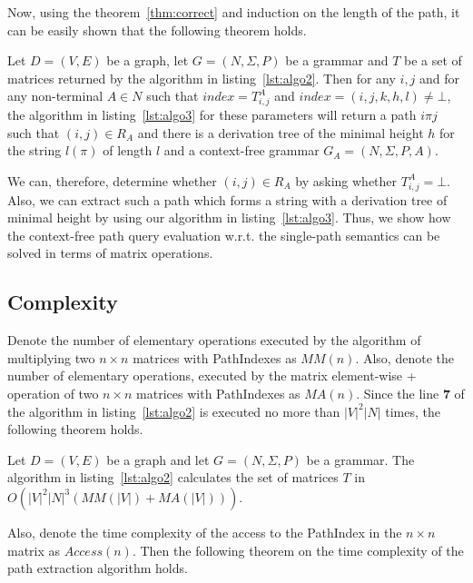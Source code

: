 Now, using the theorem~\ref{thm:correct} and induction on the length of the path, it can be easily shown that the following theorem holds.

\begin{mytheorem}\label{thm:correct_extraction}
	Let $D = (V,E)$ be a graph, let $G =(N,\Sigma,P)$ be a grammar and $T$ be a set of matrices returned by the algorithm in listing~\ref{lst:algo2}. Then for any $i, j$ and for any non-terminal $A \in N$ such that $index = T^A_{i,j}$ and $index = (i,j,k,h,l) \neq \bot$, the algorithm in listing~\ref{lst:algo3} for these parameters will return a path $i \pi j$ such that $(i,j) \in R_A$ and there is a derivation tree of the minimal height $h$ for the string $l(\pi)$ of length $l$ and a context-free grammar $G_A = (N,\Sigma,P,A)$.
\end{mytheorem}

We can, therefore, determine whether $(i,j) \in R_A$ by asking whether $T^A_{i,j} = \bot$. Also, we can extract such a path which forms a string with a derivation tree of minimal height by using our algorithm in listing~\ref{lst:algo3}. Thus, we show how the context-free path query evaluation w.r.t. the single-path semantics can be solved in terms of matrix operations.

\subsection{Complexity}

Denote the number of elementary operations executed by the algorithm of multiplying two $n \times n$ matrices with PathIndexes as $MM(n)$. Also, denote the number of elementary operations, executed by the matrix element-wise + operation of two $n \times n$ matrices with PathIndexes as $MA(n)$. Since the line \textbf{7} of the algorithm in listing~\ref{lst:algo2} is executed no more than $|V|^2|N|$ times, the following theorem holds.

\begin{mytheorem}\label{thm:time}
	Let $D = (V,E)$ be a graph and let $G =(N,\Sigma,P)$ be a grammar. The algorithm in listing~\ref{lst:algo2} calculates the set of matrices $T$ in $O(|V|^2|N|^3(MM(|V|) + MA(|V|)))$.
\end{mytheorem}

Also, denote the time complexity of the access to the PathIndex in the $n \times n$ matrix as $Access(n)$. Then the following theorem on the time complexity of the path extraction algorithm holds.

